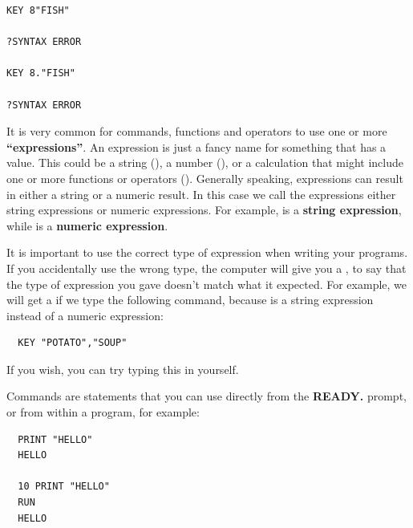 \newpage
\begin{tcolorbox}[colback=black,coltext=white]
\verbatimfont{\codefont}
\begin{verbatim}
KEY 8"FISH"

?SYNTAX ERROR

KEY 8."FISH"

?SYNTAX ERROR
\end{verbatim}
\end{tcolorbox}


It is very common for commands, functions and operators to use one or
more {\bf``expressions''}.
An expression is just a fancy name for something that has a value.
This could be a string (), a number
(), or a calculation that might include
one or more functions or operators ().
Generally speaking, expressions can result in either a string or a numeric result.
In this case we call the expressions either string expressions or numeric expressions.
For example,  is a {\bf string expression}, while
 is a {\bf numeric expression}.

It is important to use the correct type of expression when writing your programs.
If you accidentally use the wrong type, the computer will give you a
, to say that the type
of expression you gave doesn't match what it expected. For example, we will get a
 if we type the following command,
because  is a string expression instead of a numeric expression:

\begin{tcolorbox}[colback=black,coltext=white]
\verbatimfont{\codefont}
\begin{verbatim}
  KEY "POTATO","SOUP"
\end{verbatim}
\end{tcolorbox}

If you wish, you can try typing this in yourself.

Commands are statements that you can use directly from the {\bf READY.}
prompt, or from within a program, for example:

\begin{tcolorbox}[colback=black,coltext=white]
\verbatimfont{\codefont}
\begin{verbatim}
  PRINT "HELLO"
  HELLO

  10 PRINT "HELLO"
  RUN
  HELLO
\end{verbatim}
\end{tcolorbox}

